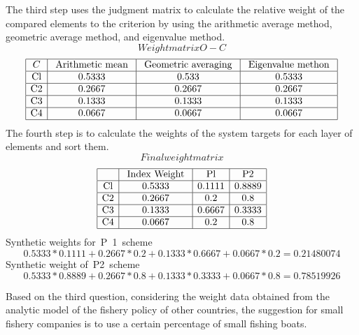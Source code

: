 \documentclass{mcmthesis}
\begin{document}
The third step uses the judgment matrix to calculate the relative weight of the compared elements to the criterion by using the arithmetic average method, geometric average method, and eigenvalue method.
$$Weight matrix O-C$$
$$
\begin{array}{|c|c|c|c|}
\hline C & {\text { Arithmetic mean }} & {\text { Geometric averaging }} & {\text { Eigenvalue methon }} \\
\hline \mathrm{Cl} & {0.5333} & {0.533} & {0.5333} \\
\hline \mathrm{C2} & {0.2667} & {0.2667} & {0.2667} \\
\hline \mathrm{C3} & {0.1333} & {0.1333} & {0.1333} \\
\hline \mathrm{C4} & {0.0667} & {0.0667} & {0.0667} \\
\hline
\end{array}
$$
The fourth step is to calculate the weights of the system targets for each layer of elements and sort them.
$$Final weight matrix$$
$$
\begin{array}{|c|c|c|c|}
\hline & {\text { Index Weight }} & {\mathrm{Pl}} & {\mathrm{P} 2} \\
\hline \mathrm{Cl} & {0.5333} & {0.1111} & {0.8889} \\
\hline \mathrm{C2} & {0.2667} & {0.2} & {0.8} \\
\hline \mathrm{C3} & {0.1333} & {0.6667} & {0.3333} \\
\hline \mathrm{C4} & {0.0667} & {0.2} & {0.8} \\
\hline
\end{array}
$$
Synthetic weights for P 1 scheme
$$0.5333 * 0.1111 + 0.2667 * 0.2 + 0.1333 * 0.6667 + 0.0667 * 0.2 = 0.21480074$$
Synthetic weight of P2 scheme
$$0 .5333 * 0.8889 + 0.2667 * 0.8 + 0.1333 * 0.3333 + 0.0667 * 0.8 = 0.78519926$$

Based on the third question, considering the weight data obtained from the analytic model of the fishery policy of other countries, the suggestion for small fishery companies is to use a certain percentage of small fishing boats.
\end{document}
